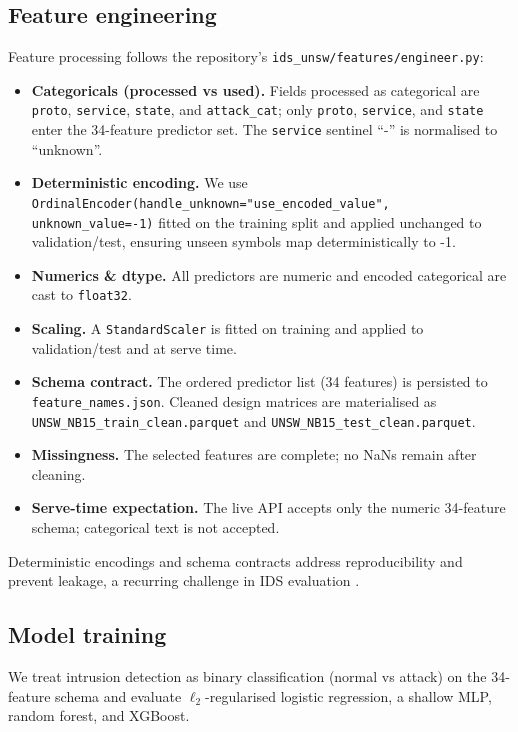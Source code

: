 \documentclass{article}
\begin{document}
\subsection{Feature engineering}
Feature processing follows the repository’s \texttt{ids\_unsw/features/engineer.py}:
\begin{itemize}
    \item \textbf{Categoricals (processed vs used).} Fields processed as categorical are \texttt{proto}, \texttt{service}, \texttt{state}, and \texttt{attack\_cat}; only \texttt{proto}, \texttt{service}, and \texttt{state} enter the 34-feature predictor set. The \texttt{service} sentinel ``-'' is normalised to ``unknown''.
    \item \textbf{Deterministic encoding.} We use \texttt{OrdinalEncoder(handle\_unknown="use\_encoded\_value", unknown\_value=-1)} fitted on the training split and applied unchanged to validation/test, ensuring unseen symbols map deterministically to -1. %
    \item \textbf{Numerics \& dtype.} All predictors are numeric and encoded categorical are cast to \texttt{float32}.
    \item \textbf{Scaling.} A \texttt{StandardScaler} is fitted on training and applied to validation/test and at serve time.
    \item \textbf{Schema contract.} The ordered predictor list (34 features) is persisted to \texttt{feature\_names.json}. Cleaned design matrices are materialised as \texttt{UNSW\_NB15\_train\_clean.parquet} and \texttt{UNSW\_NB15\_test\_clean.parquet}.
    \item \textbf{Missingness.} The selected features are complete; no NaNs remain after cleaning.
    \item \textbf{Serve-time expectation.} The live API accepts only the numeric 34-feature schema; categorical text is not accepted.
\end{itemize}
Deterministic encodings and schema contracts address reproducibility and prevent leakage, a recurring challenge in IDS evaluation \cite{alani2021}.

\subsection{Model training}
We treat intrusion detection as binary classification (normal vs attack) on the 34-feature schema and evaluate $\ell_2$-regularised logistic regression, a shallow MLP, random forest, and XGBoost.
\end{document}

